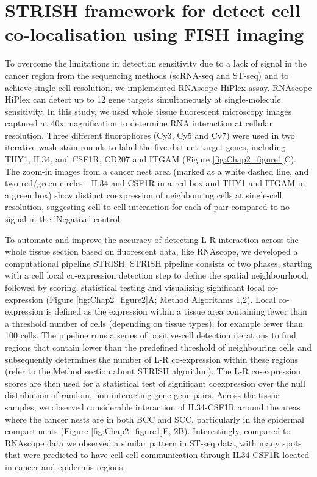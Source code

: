 \section{STRISH framework for detect cell co-localisation using FISH imaging}
\label{Sec:2.2_STRISH}	%

To overcome the limitations in detection sensitivity due to a lack of signal in the cancer region from the sequencing methods (scRNA-seq and ST-seq) and to achieve single-cell resolution, we implemented RNAscope HiPlex assay. RNAscope HiPlex can detect up to 12 gene targets simultaneously at single-molecule sensitivity. In this study, we used whole tissue fluorescent microscopy images captured at 40x magnification to determine RNA interaction at cellular resolution. Three different fluorophores (Cy3, Cy5 and Cy7) were used in two iterative wash-stain rounds to label the five distinct target genes, including THY1, IL34, and CSF1R, CD207 and ITGAM (Figure \ref{fig:Chap2_figure1}C). The zoom-in images from a cancer nest area (marked as a white dashed line, and two red/green circles - IL34 and CSF1R in a red box and THY1 and ITGAM in a green box) show distinct coexpression of neighbouring cells at single-cell resolution, suggesting cell to cell interaction for each of pair compared to no signal in the 'Negative' control. 

To automate and improve the accuracy of detecting L-R interaction across the whole tissue section based on fluorescent data, like RNAscope, we developed a computational pipeline STRISH. STRISH pipeline consists of two phases, starting with a cell local co-expression detection step to define the spatial neighbourhood, followed by scoring, statistical testing and visualizing significant local co-expression (Figure \ref{fig:Chap2_figure2}A; Method Algorithms 1,2). Local co-expression is defined as the expression within a tissue area containing fewer than a threshold number of cells (depending on tissue types), for example fewer than 100 cells. The pipeline runs a series of positive-cell detection iterations to find regions that contain lower than the predefined threshold of neighbouring cells and subsequently determines the number of L-R co-expression within these regions (refer to the Method section about STRISH algorithm). The L-R co-expression scores are then used for a statistical test of significant coexpression over the null distribution of random, non-interacting gene-gene pairs. Across the tissue samples, we observed considerable interaction of IL34-CSF1R around the areas where the cancer nests are in both BCC and SCC, particularly in the epidermal compartments (Figure \ref{fig:Chap2_figure1}E, 2B). Interestingly, compared to RNAscope data we observed a similar pattern in ST-seq data, with many spots that were predicted to have cell-cell communication through IL34-CSF1R located in cancer and epidermis regions.  

